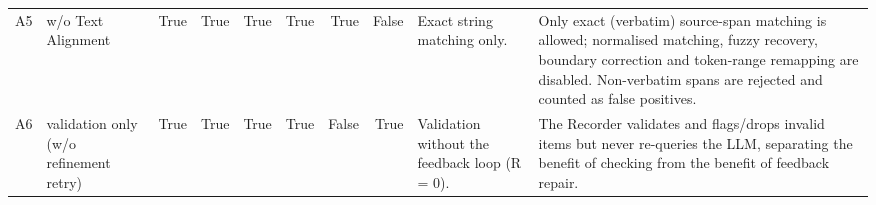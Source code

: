 \begin{table}
\begin{tabular}{llrrrrrrll}
A5 & w/o Text Alignment & True & True & True & True & True & False & Exact string matching only. & Only exact (verbatim) source-span matching is allowed; normalised matching, fuzzy recovery, boundary correction and token-range remapping are disabled. Non-verbatim spans are rejected and counted as false positives. \\
A6 & validation only (w/o refinement retry) & True & True & True & True & False & True & Validation without the feedback loop (R = 0). & The Recorder validates and flags/drops invalid items but never re-queries the LLM, separating the benefit of checking from the benefit of feedback repair. \\
\bottomrule
\end{tabular}
\end{table}
